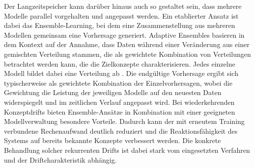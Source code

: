 %
Der Langzeitspeicher kann darüber hinaus auch so gestaltet sein, dass mehrere Modelle parallel vorgehalten und angepasst werden. Ein etablierter Ansatz ist dabei das Ensemble-Learning, bei dem eine Zusammenstellung aus mehreren Modellen gemeinsam eine Vorhersage generiert. Adaptive Ensembles basieren in dem Kontext auf der Annahme, dass Daten während einer Veränderung aus einer gemischten Verteilung stammen, die als gewichtete Kombination von Verteilungen betrachtet werden kann, die die Zielkonzepte charakterisieren. Jedes einzelne Modell bildet dabei eine Verteilung ab \cite{scholz.2007}. Die endgültige Vorhersage ergibt sich typischerweise als gewichtete Kombination der Einzelvorhersagen, wobei die Gewichtung die Leistung der jeweiligen Modelle auf den neuesten Daten widerspiegelt und im zeitlichen Verlauf angepasst wird.
Bei wiederkehrenden Konzeptdrifts bieten Ensemble-Ansätze in Kombination mit einer geeigneten Modellverwaltung besondere Vorteile. Dadurch kann der mit erneutem Training verbundene Rechenaufwand deutlich reduziert und die Reaktionsfähigkeit des Systems auf bereits bekannte Konzepte verbessert werden. Die konkrete Behandlung solcher rekurrenten Drifts ist dabei stark vom eingesetzten Verfahren und der Driftcharakteristik abhängig.

